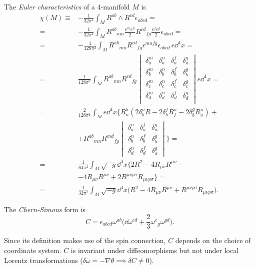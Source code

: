 \documentclass[a4paper,12pt]{book}
\begin{document}
\begin{definition}
The \emph{Euler characteristics} of a 4-manifold $M$ is
\begin{align*}
\chi(M)\equiv{}&-\frac1{32\pi^2}\int_MR^{ab}\wedge R^{cd}\epsilon_{abcd}=\\
={}&-\frac1{32\pi^2}\int_MR^{ab}{}_{mn}\frac{e^me^n}{2}R^{cd}{}_{fg}\frac{e^fe^g}{2}\epsilon_{abcd}=\\
={}&-\frac1{128\pi^2}\int_MR^{ab}{}_{mn}R^{cd}{}_{fg}\epsilon^{mnfg}\epsilon_{abcd}\,e\dd^4x=\\
={}&\frac1{128\pi^2}\int_MR^{ab}{}_{mn}R^{cd}{}_{fg}
\begin{vmatrix}
\delta^m_a & \delta^n_a & \delta^f_a & \delta^g_a\\
\delta^m_b & \delta^n_b & \delta^f_b & \delta^g_b\\
\delta^m_c & \delta^n_c & \delta^f_c & \delta^g_c\\
\delta^m_d & \delta^n_d & \delta^f_d & \delta^g_d\\
\end{vmatrix}
e\dd^4x=\\
={}&\frac2{128\pi^2}\int_Me\dd^4x\biggl\{R^b_n(2\delta^n_bR-2\delta^f_bR^n_f-2\delta^g_bR^n_g)+{}\\
&+R^{ab}{}_{mn}R^{md}{}_{fg}
\begin{vmatrix}
\delta^n_a & \delta^f_a & \delta^g_a\\
\delta^n_b & \delta^f_b & \delta^g_b\\
\delta^n_d & \delta^f_d & \delta^g_d
\end{vmatrix}
\biggr\}=\\
={}&\frac1{64\pi^2}\int_M\sqrt{-g}\dd^4x\bigl\{2R^2-4R_{\mu\nu}R^{\mu\nu}-{}\\
&-4R_{\mu\nu}R^{\mu\nu}+2R^{\mu\nu\rho\sigma}R_{\mu\nu\rho\sigma}\bigr\}=\\
={}&\frac1{32\pi^2}\int_M\sqrt{-g}\dd^4x\bigl(R^2-4R_{\mu\nu}R^{\mu\nu}+R^{\mu\nu\rho\sigma}R_{\mu\nu\rho\sigma}\bigr).
\end{align*}
\end{definition}

\begin{definition}
The \emph{Chern-Simons} form is
\[C=\epsilon_{abcd}\omega^{ab}\biggl(\dd\omega^{cd}+\frac23\omega^c{}_g\omega^{gd}\biggr).\]
\end{definition}

Since its definition makes use of the spin connection, $C$ depends on the choice of coordinate system. $C$ is invariant under diffeomorphisms but not under local Lorentz transformations ($\delta\omega=-\nabla\theta\implies\delta C\ne0$).
\end{document}
